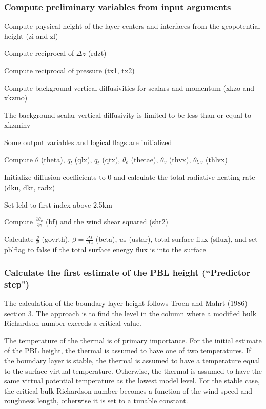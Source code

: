 \subsubsection*{Compute preliminary variables from input arguments}


\begin{DoxyItemize}
\item Compute physical height of the layer centers and interfaces from the geopotential height (zi and zl)
\item Compute reciprocal of $ \Delta z $ (rdzt)
\item Compute reciprocal of pressure (tx1, tx2)
\item Compute background vertical diffusivities for scalars and momentum (xkzo and xkzmo)
\item The background scalar vertical diffusivity is limited to be less than or equal to xkzminv
\item Some output variables and logical flags are initialized
\item Compute $\theta$ (theta), $q_l$ (qlx), $q_t$ (qtx), $\theta_e$ (thetae), $\theta_v$ (thvx), $\theta_{l,v}$ (thlvx)
\item Initialize diffusion coefficients to 0 and calculate the total radiative heating rate (dku, dkt, radx)
\item Set lcld to first index above 2.\+5km
\item Compute $\frac{\partial \theta_v}{\partial z}$ (bf) and the wind shear squared (shr2)
\item Calculate $\frac{g}{\theta}$ (govrth), $\beta = \frac{\Delta t}{\Delta z}$ (beta), $u_*$ (ustar), total surface flux (sflux), and set pblflag to false if the total surface energy flux is into the surface
\end{DoxyItemize}

\subsubsection*{Calculate the first estimate of the P\+BL height (``\+Predictor step")}

The calculation of the boundary layer height follows Troen and Mahrt (1986) \cite{troen_and_mahrt_1986} section 3. The approach is to find the level in the column where a modified bulk Richardson number exceeds a critical value.

The temperature of the thermal is of primary importance. For the initial estimate of the P\+BL height, the thermal is assumed to have one of two temperatures. If the boundary layer is stable, the thermal is assumed to have a temperature equal to the surface virtual temperature. Otherwise, the thermal is assumed to have the same virtual potential temperature as the lowest model level. For the stable case, the critical bulk Richardson number becomes a function of the wind speed and roughness length, otherwise it is set to a tunable constant.

